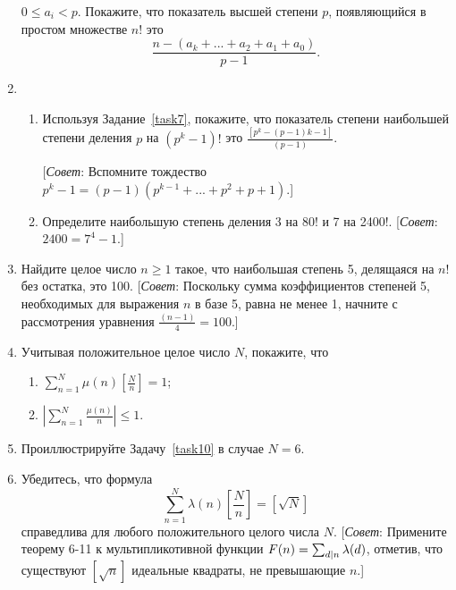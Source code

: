 \documentclass[11pt]{article}
\begin{document}
\begin{enumerate}
	$ 0\le a_{i}<p $. Покажите, что показатель высшей степени $ p $, появляющийся в простом множестве $ n! $ это
	\[\frac{n-\left( a_{k}+...+ a_{2}+a_{1}+a_{0}\right) }{p-1}.\]
	\item 
	\begin{enumerate}
		\label{task7}
		\item Используя Задание~\ref{task7}, покажите, что показатель степени наибольшей степени деления $ p $ на $ \left( p^{k}-1\right) ! $ это $ \frac{\left[ p^{k}-\left( p-1\right)k-1\right]   }{\left( p-1\right) } $. 
		
		[\textit{Совет}: Вспомните тождество $ p^{k}-1=\left( p-1\right) \left( p^{k-1}+...+p^{2}+p+1\right)  $.]
		\item Определите наибольшую степень деления 3 на 80! и 7 на 2400!. [\textit{Совет}: $2400=7^{4}-1$.]
	\end{enumerate}	
	\item Найдите целое число $ n\ge1 $ такое, что наибольшая степень 5, делящаяся на $ n! $ без остатка, это 100. [\textit{Совет}: Поскольку сумма коэффициентов степеней 5, необходимых для выражения $ n $ в базе 5, равна не менее 1, начните с рассмотрения уравнения $ \frac{\left( n-1\right) }{4}=100 $.]
	\item Учитывая положительное целое число $ N $, покажите, что 
	\begin{enumerate}
		\item $\sum\limits_{n=1}^{N}\mu(n)\left[ \frac{N}{n} \right] =1 $;
		\item $\left|\sum\limits_{n=1}^{N}\frac{\mu(n)}{n}\right| \le1 $.
	\end{enumerate}
	\label{task10}	
	\item Проиллюстрируйте Задачу~\ref{task10} в случае $ N=6 $.
	\item Убедитесь, что формула 
	\[\sum_{n=1}^{N}\lambda(n)\left[ \frac{N}{n}\right] =\left[ \sqrt{N}\right]\]
	справедлива для любого положительного целого числа $ N $. [\textit{Совет}: Примените теорему 6-11 к мультипликотивной функции $ F(n)=\sum_{\tiny d|n}\lambda(d) $, отметив, что существуют $ \left[ \sqrt{n}\right]  $ идеальные квадраты, не превышающие $ n $.]
\end{enumerate}
\end{document}
